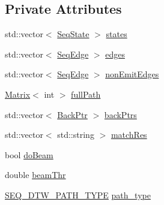 \subsection*{Private Attributes}
\begin{DoxyCompactItemize}
\item 
std\+::vector$<$ \hyperlink{struct_seq_state}{Seq\+State} $>$ \hyperlink{class_seq_model_af937cc40b67b7c5063feab1950445b88}{states}
\item 
std\+::vector$<$ \hyperlink{struct_seq_edge}{Seq\+Edge} $>$ \hyperlink{class_seq_model_ab293b1600e51e35d49bc33a45f74dd9d}{edges}
\item 
std\+::vector$<$ \hyperlink{struct_seq_edge}{Seq\+Edge} $>$ \hyperlink{class_seq_model_a3524cea66ad824e5ba165f09080dc8eb}{non\+Emit\+Edges}
\item 
\hyperlink{configure__basic_8h_a566a006016cf65b1b01bd2bc633e1c12}{Matrix}$<$ int $>$ \hyperlink{class_seq_model_aa67e8940bd4deb4174dcb8037263b385}{full\+Path}
\item 
std\+::vector$<$ \hyperlink{struct_back_ptr}{Back\+Ptr} $>$ \hyperlink{class_seq_model_ac6d529a3e49a26fae3566695d235d333}{back\+Ptrs}
\item 
std\+::vector$<$ std\+::string $>$ \hyperlink{class_seq_model_a54fb4d0461e8aaec7c53568a6ff572fa}{match\+Res}
\item 
bool \hyperlink{class_seq_model_a0a5eba8ce2a6eccc2a595816813538fc}{do\+Beam}
\item 
double \hyperlink{class_seq_model_a11a6ea74af16863e3bf7c8c967de281f}{beam\+Thr}
\item 
\hyperlink{class_seq_model_a145b769692f03811a15c5289fe77da42}{S\+E\+Q\+\_\+\+D\+T\+W\+\_\+\+P\+A\+T\+H\+\_\+\+T\+Y\+P\+E} \hyperlink{class_seq_model_afa1904812bb4a3363960db559983e195}{path\+\_\+type}
\end{DoxyCompactItemize}


